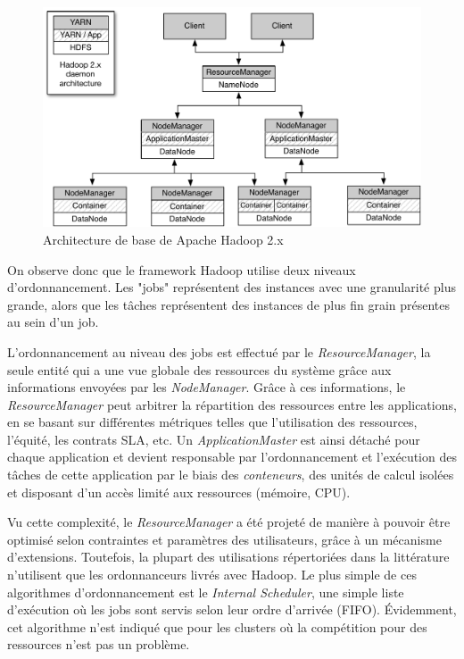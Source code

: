 \begin{figure}[!ht]
	\centering
	\includegraphics[width=0.85\linewidth]{img/HadoopArch.pdf}
	\caption{Architecture de base de Apache Hadoop 2.x}
	\label{fig:ArquiteturaHadoop}
\end{figure}


On observe donc que le framework Hadoop utilise deux niveaux d'ordonnancement. Les "jobs" représentent des instances avec une granularité plus grande, alors que les tâches représentent des instances de plus fin grain présentes au sein d'un job. 

L'ordonnancement au niveau des jobs est effectué par le \textit{ResourceManager}, la seule entité qui a une vue globale des ressources du système grâce aux informations envoyées par les \textit{NodeManager}. Grâce à ces informations, le \textit{ResourceManager} peut arbitrer la répartition des ressources entre les applications, en se basant sur différentes métriques telles que l'utilisation des ressources, l'équité, les contrats SLA, etc. Un \textit{ApplicationMaster} est ainsi détaché pour chaque application et devient responsable par l'ordonnancement et l'exécution des tâches de cette application par le biais des \textit{conteneurs}, des unités de calcul isolées et disposant d'un accès limité aux ressources (mémoire, CPU). 

Vu cette complexité, le \textit{ResourceManager} a été projeté de manière à pouvoir être optimisé selon contraintes et paramètres des utilisateurs, grâce à un mécanisme d'extensions. Toutefois, la plupart des utilisations répertoriées dans la littérature n'utilisent que les ordonnanceurs livrés avec Hadoop. Le plus simple de ces algorithmes d'ordonnancement est le \textit{Internal Scheduler}, une simple liste d'exécution où les jobs sont servis selon leur ordre d'arrivée (FIFO). Évidemment, cet algorithme n'est indiqué que pour les clusters où la compétition pour des ressources n'est pas un problème. 

